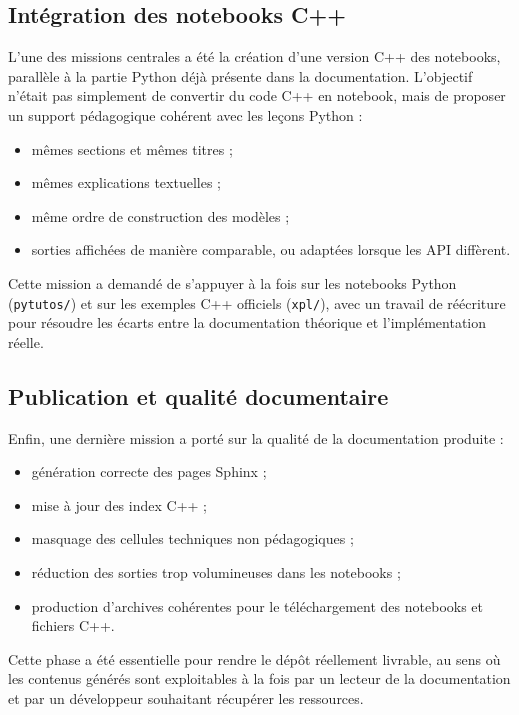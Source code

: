 \documentclass[a4paper,12pt,twoside]{article}
\begin{document}
\subsection{Intégration des notebooks C++}

L'une des missions centrales a été la création d'une version C++ des notebooks, parallèle à la partie Python déjà présente dans la documentation. L'objectif n'était pas simplement de convertir du code C++ en notebook, mais de proposer un support pédagogique cohérent avec les leçons Python :
\begin{itemize}
    \item mêmes sections et mêmes titres ;
    \item mêmes explications textuelles ;
    \item même ordre de construction des modèles ;
    \item sorties affichées de manière comparable, ou adaptées lorsque les API diffèrent.
\end{itemize}

Cette mission a demandé de s'appuyer à la fois sur les notebooks Python (\texttt{pytutos/}) et sur les exemples C++ officiels (\texttt{xpl/}), avec un travail de réécriture pour résoudre les écarts entre la documentation théorique et l'implémentation réelle.

\subsection{Publication et qualité documentaire}

Enfin, une dernière mission a porté sur la qualité de la documentation produite :
\begin{itemize}
    \item génération correcte des pages Sphinx ;
    \item mise à jour des index C++ ;
    \item masquage des cellules techniques non pédagogiques ;
    \item réduction des sorties trop volumineuses dans les notebooks ;
    \item production d'archives cohérentes pour le téléchargement des notebooks et fichiers C++.
\end{itemize}

Cette phase a été essentielle pour rendre le dépôt réellement livrable, au sens où les contenus générés sont exploitables à la fois par un lecteur de la documentation et par un développeur souhaitant récupérer les ressources.
\end{document}
